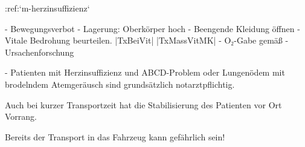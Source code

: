 
:ref:`m-herzinsuffizienz`
\begin{itemize}
  -   Bewegungsverbot
  -   Lagerung: Oberkörper hoch
  -   Beengende Kleidung öffnen
  -   Vitale Bedrohung beurteilen. |TxBeiVit| |TxMassVitMK|
  -   O₂-Gabe gemäß 
  -   Ursachenforschung
\end{itemize}

\begin{Danger}
  -   Patienten mit Herzinsuffizienz und ABCD-Problem oder Lungenödem mit 
  brodelndem Atemgeräusch sind grundsätzlich notarztpflichtig. 
  
  Auch bei kurzer Transportzeit hat die Stabilisierung des Patienten vor Ort Vorrang.
  
  Bereits der Transport in das Fahrzeug kann gefährlich sein!
\end{Danger}
